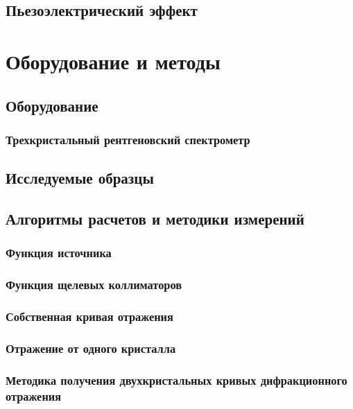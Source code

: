 \documentclass[pdftex,a4paper,14pt,english,russian]{extarticle}
\numberwithin{equation}{subsection}
\newcounter{subsubsubsection}[subsubsection]
\begin{document}
  \subsection{Пьезоэлектрический эффект}
    

\newpage
\section{Оборудование и методы}
  \subsection{Оборудование}
    \subsubsection{Трехкристальный рентгеновский спектрометр}
      
  \subsection{Исследуемые образцы}
  \subsection{Алгоритмы расчетов и методики измерений}
    \subsubsection{Функция источника}
      
    \subsubsection{Функция щелевых коллиматоров}
      
    \subsubsection{Собственная кривая отражения}
      
    \subsubsection{Отражение от одного кристалла}
      
    \subsubsection{Методика получения двухкристальных кривых дифракционного отражения}
      
      
\end{document}
